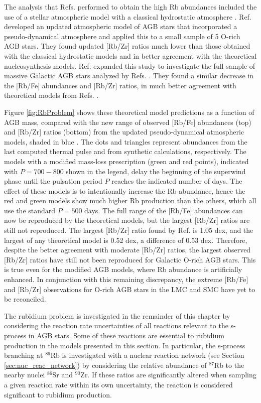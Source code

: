 The analysis that Refs. \cite{Garcia2006,Garcia2007,Garcia2009} performed to obtain the high Rb abundances included the use of a stellar atmospheric model with a classical hydrostatic atmosphere \cite{Gustafsson2008}. Ref. \cite{Zamora2014} developed an updated atmospheric model of AGB stars that incorporated a pseudo-dynamical atmosphere and applied this to a small sample of 5 O-rich AGB stars. They found updated [Rb/Zr] ratios much lower than those obtained with the classical hydrostatic models and in better agreement with the theoretical nucleosynthesis models. Ref. \cite{Perez2017} expanded this study to investigate the full sample of massive Galactic AGB stars analyzed by Refs. \cite{Garcia2006,Garcia2007}. They found a similar decrease in the [Rb/Fe] abundances and [Rb/Zr] ratios, in much better agreement with theoretical models from Refs. \cite{Karakas2012,Raai2012,Karakas2016,Pignatari2016}. 

Figure \ref{fig:RbProblem} shows these theoretical model predictions as a function of AGB mass, compared with the new range of observed [Rb/Fe] abundances (top) and [Rb/Zr] ratios (bottom) from the updated pseudo-dynamical atmospheric models, shaded in blue \cite{Perez2017}. The dots and triangles represent abundances from the last computed thermal pulse and from synthetic calculations, respectively. The models with a modified mass-loss prescription (green and red points), indicated with $P=700-800$ shown in the legend, delay the beginning of the superwind phase until the pulsation period $P$ reaches the indicated number of days. The effect of these models is to intentionally increase the Rb abundance, hence the red and green models show much higher Rb production than the others, which all use the standard $P=500$ days. The full range of the [Rb/Fe] abundances can now be reproduced by the theoretical models, but the largest [Rb/Zr] ratios are still not reproduced. The largest [Rb/Zr] ratio found by Ref. \cite{Perez2017} is 1.05 dex, and the largest of any theoretical model is 0.52 dex, a difference of 0.53 dex. Therefore, despite the better agreement with moderate [Rb/Zr] ratios, the largest observed [Rb/Zr] ratios have still not been reproduced for Galactic O-rich AGB stars. This is true even for the modified AGB models, where Rb abundance is artificially enhanced. In conjunction with this remaining discrepancy, the extreme [Rb/Fe] and [Rb/Zr] observations for O-rich AGB stars in the LMC and SMC \cite{Garcia2009} have yet to be reconciled.

The rubidium problem is investigated in the remainder of this chapter by considering the reaction rate uncertainties of all reactions relevant to the s-process in AGB stars. Some of these reactions are essential to rubidium production in the models presented in this section. In particular, the s-process branching at $^{86}$Rb is investigated with a nuclear reaction network (see Section \ref{sec:nuc_reac_network}) by considering the relative abundance of $^{87}$Rb to the nearby nuclei $^{86}$Sr and $^{90}$Zr. If these ratios are significantly altered when sampling a given reaction rate within its own uncertainty, the reaction is considered significant to rubidium production.

